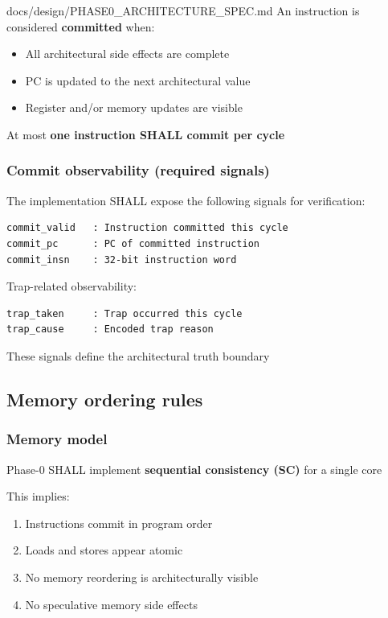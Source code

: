 \begin{relocated}{docs/design/PHASE0_ARCHITECTURE_SPEC.md}
An instruction is considered \textbf{committed} when:

\begin{itemize}
\tightlist
\item
  All architectural side effects are complete
\item
  PC is updated to the next architectural value
\item
  Register and/or memory updates are visible
\end{itemize}

At most \textbf{one instruction SHALL commit per cycle}

\subsubsection{Commit observability (required signals)}\label{ds:ch:phase0-architecture:commit-observability-required-signals}

The implementation SHALL expose the following signals for verification:

\begin{lstlisting}[language={}]
commit_valid   : Instruction committed this cycle
commit_pc      : PC of committed instruction
commit_insn    : 32-bit instruction word
\end{lstlisting}

Trap-related observability:

\begin{lstlisting}[language={}]
trap_taken     : Trap occurred this cycle
trap_cause     : Encoded trap reason
\end{lstlisting}

These signals define the architectural truth boundary

\subsection{Memory ordering rules}\label{ds:ch:phase0-architecture:memory-ordering-rules}

\subsubsection{Memory model}\label{ds:ch:phase0-architecture:memory-model}

Phase-0 SHALL implement \textbf{sequential consistency (SC)} for a
single core

This implies:

\begin{enumerate}
\def\labelenumi{\arabic{enumi}.}
\tightlist
\item
  Instructions commit in program order
\item
  Loads and stores appear atomic
\item
  No memory reordering is architecturally visible
\item
  No speculative memory side effects
\end{enumerate}


\end{relocated}
